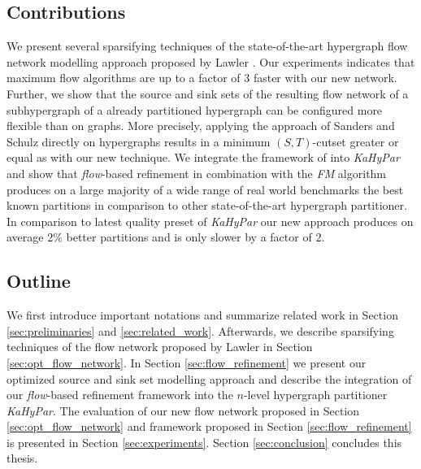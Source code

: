 \subsection{Contributions}

We present several sparsifying techniques of the state-of-the-art hypergraph flow network
modelling approach proposed by Lawler \cite{lawler1973}. Our experiments indicates that
maximum flow algorithms are up to a factor of $3$ faster with our new network. Further, 
we show that the source and sink sets of the resulting flow network of a subhypergraph 
of a already partitioned hypergraph can be configured more flexible than on graphs. More 
precisely, applying the approach of Sanders and Schulz \cite{sanders2011engineering}
directly on hypergraphs results in a minimum $(S,T)$-cutset greater or equal as with
our new technique. We integrate the framework of \cite{sanders2011engineering} into 
\emph{KaHyPar} and show that \emph{flow}-based refinement in combination with the
\emph{FM} algorithm produces on a large majority of a wide range of real world
benchmarks the best known partitions in comparison to other state-of-the-art hypergraph
partitioner. In comparison to latest quality preset of \emph{KaHyPar} our new approach
produces on average $2\%$ better partitions and is only slower by a factor of $2$.

\subsection{Outline}

We first introduce important notations and summarize related work in Section \ref{sec:preliminaries}
and \ref{sec:related_work}. Afterwards, we describe sparsifying techniques of the flow network
proposed by Lawler \cite{lawler1973} in Section \ref{sec:opt_flow_network}. In Section
\ref{sec:flow_refinement} we present our optimized source and sink set modelling
approach and describe the integration of our \emph{flow}-based refinement framework into
the $n$-level hypergraph partitioner \emph{KaHyPar}. The evaluation of our new flow network
proposed in Section \ref{sec:opt_flow_network} and framework proposed in Section 
\ref{sec:flow_refinement} is presented in Section \ref{sec:experiments}. 
Section \ref{sec:conclusion} concludes this thesis.